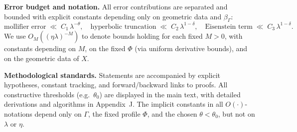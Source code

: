 \medskip
\noindent\textbf{Error budget and notation.}
All error contributions are separated and bounded with explicit constants
depending only on geometric data and $\beta_\Gamma$:
\[
  \text{mollifier error} \;\ll\; C_1\,\lambda^{-\theta},\quad
  \text{hyperbolic truncation} \;\ll\; C_2\,\lambda^{1-\delta},\quad
  \text{Eisenstein term} \;\ll\; C_3\,\lambda^{1-\delta}.
\]
We use $O_M((\eta\lambda)^{-M})$ to denote bounds holding for each fixed $M>0$,
with constants depending on $M$, on the fixed $\Phi$ (via uniform derivative
bounds), and on the geometric data of $X$.

\medskip
\noindent\textbf{Methodological standards.}
Statements are accompanied by explicit hypotheses, constant tracking, and
forward/backward links to proofs. All constructive thresholds (e.g.\ $\theta_0$)
are displayed in the main text, with detailed derivations and algorithms in
Appendix~J. The implicit constants in all $O(\cdot)$-notations depend only on
$\Gamma$, the fixed profile $\Phi$, and the chosen $\theta<\theta_0$, but not on
$\lambda$ or $\eta$.

